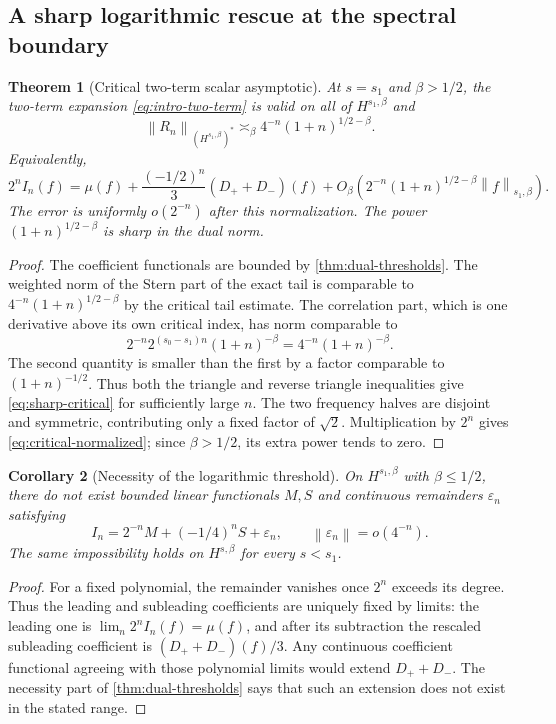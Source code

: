 \documentclass[11pt,a4paper]{article}
\newtheorem{theorem}{Theorem}[section]
\newtheorem{corollary}[theorem]{Corollary}
\theoremstyle{definition}
\theoremstyle{remark}
\newcommand{\norm}[1]{\left\lVert#1\right\rVert}
\numberwithin{equation}{section}
\begin{document}
\subsection{A sharp logarithmic rescue at the spectral boundary}
\begin{theorem}[Critical two-term scalar asymptotic]
\label{thm:critical-remainder}
At $s=s_1$ and $\beta>1/2$, the two-term expansion
\eqref{eq:intro-two-term} is valid on all of $H^{s_1,\beta}$ and
\begin{equation}
 \norm{R_n}_{(H^{s_1,\beta})^*}
 \asymp_\beta4^{-n}(1+n)^{1/2-\beta}.
 \label{eq:sharp-critical}
\end{equation}
Equivalently,
\begin{equation}
 2^n I_n(f)=\mu(f)+\frac{(-1/2)^n}{3}(D_++D_-)(f)
 +O_\beta\!\left(2^{-n}(1+n)^{1/2-\beta}\norm f_{s_1,\beta}\right).
 \label{eq:critical-normalized}
\end{equation}
The error is uniformly $o(2^{-n})$ after this normalization. The power
$(1+n)^{1/2-\beta}$ is sharp in the dual norm.
\end{theorem}
\begin{proof}
The coefficient functionals are bounded by \cref{thm:dual-thresholds}.
The weighted norm of the Stern part of the exact tail is comparable to
$4^{-n}(1+n)^{1/2-\beta}$ by the critical tail estimate. The correlation
part, which is one derivative above its own critical index, has norm
comparable to
\[
 2^{-n}2^{(s_0-s_1)n}(1+n)^{-\beta}
 =4^{-n}(1+n)^{-\beta}.
\]
The second quantity is smaller than the first by a factor comparable to
$(1+n)^{-1/2}$. Thus both the triangle and reverse triangle inequalities
give \eqref{eq:sharp-critical} for sufficiently large $n$. The two
frequency halves are disjoint and symmetric, contributing only a fixed
factor of $\sqrt2$. Multiplication by $2^n$ gives
\eqref{eq:critical-normalized}; since $\beta>1/2$, its extra power tends
to zero.
\end{proof}

\begin{corollary}[Necessity of the logarithmic threshold]
\label{cor:no-endpoint-without-log}
On $H^{s_1,\beta}$ with $\beta\le1/2$, there do not exist bounded linear
functionals $M,S$ and continuous remainders $\varepsilon_n$ satisfying
\[
 I_n=2^{-n}M+(-1/4)^nS+\varepsilon_n,\qquad
 \norm{\varepsilon_n}=o(4^{-n}).
\]
The same impossibility holds on $H^{s,\beta}$ for every $s<s_1$.
\end{corollary}
\begin{proof}
For a fixed polynomial, the remainder vanishes once $2^n$ exceeds its
degree. Thus the leading and subleading coefficients are uniquely fixed
by limits: the leading one is $\lim_n2^nI_n(f)=\mu(f)$, and after its
subtraction the rescaled subleading coefficient is
$(D_++D_-)(f)/3$. Any continuous coefficient functional agreeing with
those polynomial limits would extend $D_++D_-$. The necessity part of
\cref{thm:dual-thresholds} says that such an extension does not exist in
the stated range.
\end{proof}
\end{document}
